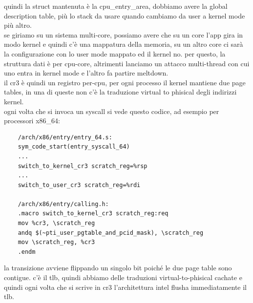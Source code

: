 \documentclass[12pt, oneside]{extbook} %
\begin{document}
quindi la struct mantenuta è la \textsf{cpu\_entry\_area}, dobbiamo avere la global description table, più lo stack da usare quando cambiamo da user a kernel mode più altro.\\
se giriamo su un sistema multi-core, possiamo avere che su un core l'app gira in modo kernel e quindi c'è una mappatura della memoria, su un altro core ci sarà la configurazione con lo user mode mappato ed il kernel no. per questo, la struttura dati è per cpu-core, altrimenti lanciamo un attacco multi-thread con cui uno entra in kernel mode e l'altro fa partire meltdown.\\ il cr3 è quindi un registro per-cpu, per ogni processo il kernel mantiene due page tables, in una di queste non c'è la traduzione virtual to phisical degli indirizzi kernel.\\ ogni volta che si invoca un syscall si vede questo codice, ad esempio per processori x86\_64:
\begin{lstlisting}
	/arch/x86/entry/entry_64.s:
	sym_code_start(entry_syscall_64)
	...
	switch_to_kernel_cr3 scratch_reg=%rsp
	...
	switch_to_user_cr3 scratch_reg=%rdi
	
	/arch/x86/entry/calling.h:
	.macro switch_to_kernel_cr3 scratch_reg:req
	mov %cr3, \scratch_reg
	andq $(~pti_user_pgtable_and_pcid_mask), \scratch_reg
	mov \scratch_reg, %cr3
	.endm
\end{lstlisting}
la transizione avviene flippando un singolo bit poiché le due page table sono contigue. c'è il tlb, quindi abbiamo delle traduzioni virtual-to-phisical cachate e quindi ogni volta che si scrive in cr3 l'architettura intel flusha immediatamente il tlb.
\end{document}
